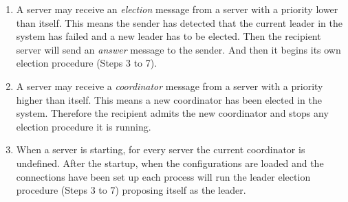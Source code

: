 \documentclass[dareport.tex]{subfiles}
\begin{document}
\begin{enumerate}[leftmargin=*]
	\item A server may receive an \emph{election} message from a server with a priority lower than itself. This means the sender has detected that the current leader in the system has failed and a new leader has to be elected. Then the recipient server will send an \emph{answer} message to the sender. And then it begins its own election procedure (Steps 3 to 7).
	\item A server may receive a \emph{coordinator} message from a server with a priority higher than itself. This means a new coordinator has been elected in the system. Therefore the recipient admits the new coordinator and stops any election procedure it is running.
	\item When a server is starting, for every server the current coordinator is undefined. After the startup, when the configurations are loaded and the connections have been set up each process will run the leader election procedure (Steps 3 to 7) proposing itself as the leader.
\end{enumerate}
\end{document}
